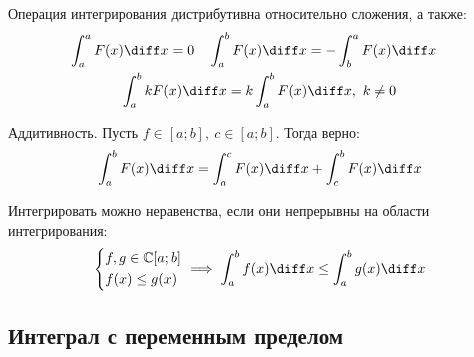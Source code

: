 Операция интегрирования {\ital дистрибутивна} относительно {\ital сложения}, а также:
\begin{gather*}
\begin{aligned}
&\int_a^aF(x)\diff x=0 & &\int_a^bF(x)\diff x=-\int_b^aF(x)\diff x
\end{aligned}\\
\int_a^b kF(x)\diff x=k\int_a^b F(x)\diff x,\ k\neq 0
\end{gather*}
\begin{theorem}
{\bold Аддитивность.} Пусть $f\in[a;b],\ c\in[a;b]$. Тогда верно:
$$\int_a^bF(x)\diff x=\int_a^cF(x)\diff x+\int_c^bF(x)\diff x$$
\end{theorem}
Интегрировать можно {\ital неравенства}, если они непрерывны на области интегрирования:
$$\left\{\begin{aligned}
&f,g\in\mathbb{C}[a;b]\\
&f(x)\leq g(x)
\end{aligned}\right.\implies
\int_a^bf(x)\diff x\leq\int_a^bg(x)\diff x$$

\subsection{Интеграл с переменным пределом}

